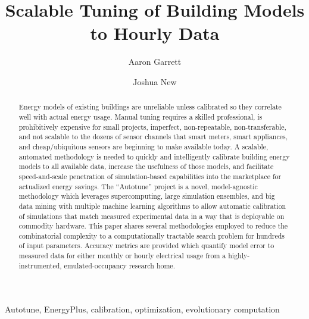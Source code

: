 \documentclass[preprint, review, 12pt]{elsarticle}
\begin{document}
\begin{frontmatter}

\title{Scalable Tuning of Building Models to Hourly Data}

\author[atr:garrett]{Aaron Garrett}
\author[atr:new]{Joshua New}

\address[atr:garrett]{Mathematical, Computing, and Information Sciences, Jacksonville State University, Jacksonville, AL, USA}
\address[atr:new]{Oak Ridge National Laboratory, Oak Ridge, TN, USA}


\begin{abstract}
Energy models of existing buildings are unreliable unless calibrated so they correlate well with actual energy usage. Manual tuning requires a skilled professional, is prohibitively expensive for small projects, imperfect, non-repeatable, non-transferable, and not scalable to the dozens of sensor channels that smart meters, smart appliances, and cheap/ubiquitous sensors are beginning to make available today. A scalable, automated methodology is needed to quickly and intelligently calibrate building energy models to all available data, increase the usefulness of those models, and facilitate speed-and-scale penetration of simulation-based capabilities into the marketplace for actualized energy savings. The ``Autotune'' project is a novel, model-agnostic methodology which leverages supercomputing, large simulation ensembles, and big data mining with multiple machine learning algorithms to allow automatic calibration of simulations that match measured experimental data in a way that is deployable on commodity hardware. This paper shares several methodologies employed to reduce the combinatorial complexity to a computationally tractable search problem for hundreds of input parameters. Accuracy metrics are provided which quantify model error to measured data for either monthly or hourly electrical usage from a highly-instrumented, emulated-occupancy research home.
\end{abstract}

\begin{keyword}
Autotune, EnergyPlus, calibration, optimization, evolutionary computation
\end{keyword}

\end{frontmatter}

\end{document}
